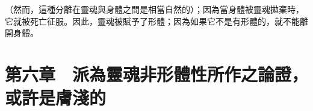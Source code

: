 \par

\par

（然而，這種分離在靈魂與身體之間是相當自然的）；因為當身體被靈魂拋棄時，它就被死亡征服。因此，靈魂被賦予了形體；因為如果它不是有形體的，就不能離開身體。\par


\section{第六章　派為靈魂非形體性所作之論證，或許是膚淺的}

